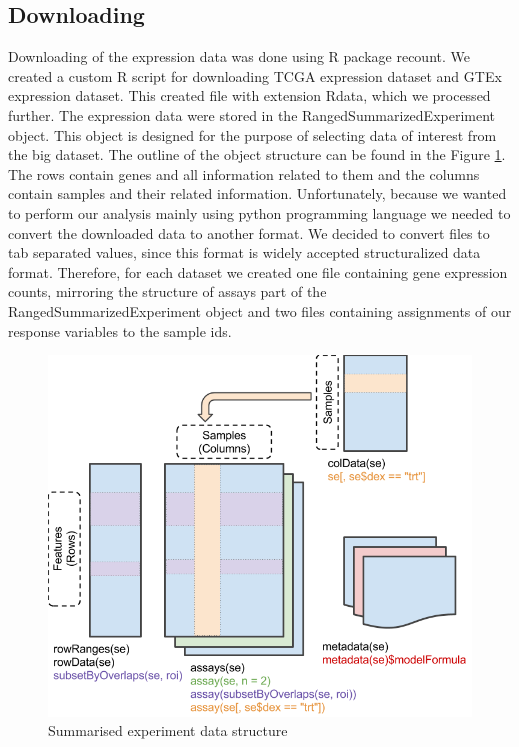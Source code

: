 \subsection{Downloading}
Downloading of the expression data was done using R package recount. \cite{collado2017reproducible}
We created a custom R script for downloading TCGA expression dataset and GTEx expression dataset.
This created file with extension Rdata, which we processed further.
The expression data were stored in the RangedSummarizedExperiment object.
This object is designed for the purpose of selecting data of interest from the big dataset.
The outline of the object structure can be found in the Figure \ref{fig:sre}.
The rows contain genes and all information related to them and the columns contain samples and their related information.
Unfortunately, because we wanted to perform our analysis mainly using python programming language we needed to convert the downloaded data to another format.
We decided to convert files to tab separated values, since this format is widely accepted structuralized data format.
Therefore, for each dataset we created one file containing gene expression counts, mirroring the structure of assays part of the RangedSummarizedExperiment object and two files containing assignments of our response variables to the sample ids.

\begin{figure}
    \includegraphics[width=\linewidth]{images/SummarizedExperiment.png}
    \caption{Summarised experiment data structure}
    \label{fig:sre}
\end{figure}

